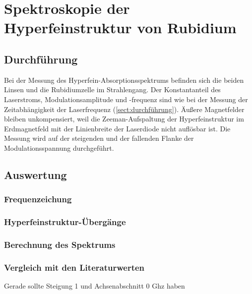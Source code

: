 \section{Spektroskopie der Hyperfeinstruktur von Rubidium}
\subsection{Durchführung}
Bei der Messung des Hyperfein-Absorptionsspektrums befinden sich die beiden Linsen und
die Rubidiumzelle im Strahlengang.
Der Konstantanteil des Laserstroms, Modulationsamplitude und -frequenz
sind wie bei der Messung der Zeitabhängigkeit der Laserfrequenz (\autoref{sect:durchführung}).
Äußere Magnetfelder bleiben unkompensiert, weil die Zeeman-Aufspaltung der Hyperfeinstruktur im Erdmagnetfeld
mit der Linienbreite der Laserdiode nicht auflösbar ist.
Die Messung wird auf der steigenden und der fallenden Flanke der Modulationsspannung durchgeführt.


\subsection{Auswertung}
\subsubsection*{Frequenzeichung}
\subsubsection*{Hyperfeinstruktur-Übergänge}
\subsubsection*{Berechnung des Spektrums}
\subsubsection*{Vergleich mit den Literaturwerten}
Gerade sollte Steigung 1 und Achsenabschnitt 0 Ghz haben